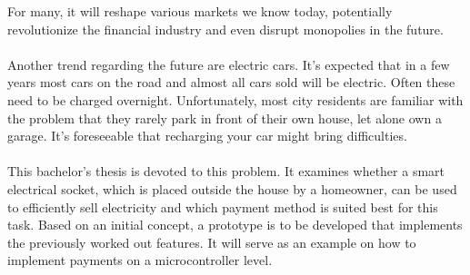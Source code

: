 For many, it will reshape various markets we know today, potentially revolutionize the financial industry and even disrupt monopolies in the future.
\\\\
Another trend regarding the future are electric cars.
It's expected that in a few years most cars on the road and almost all cars sold will be electric.
Often these need to be charged overnight.
Unfortunately, most city residents are familiar with the problem that they rarely park in front of their own house, let alone own a garage.
It's foreseeable that recharging your car might bring difficulties.
\\\\ 
This bachelor's thesis is devoted to this problem.
It examines whether a smart electrical socket, which is placed outside the house by a homeowner, can be used to efficiently sell electricity and which payment method is suited best for this task.
Based on an initial concept, a prototype is to be developed that implements the previously worked out features.
It will serve as an example on how to implement  payments on a microcontroller level.